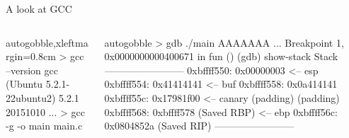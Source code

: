 \documentclass[beamer]{uibk}
\begin{document}
\begin{frame}[fragile]{A look at GCC}
    \begin{columns}
        \begin{column}{0.5\textwidth}
            \begin{pre*}{autogobble,xleftmargin=0.8cm}
                > gcc --version
                gcc (Ubuntu 5.2.1-22ubuntu2) 5.2.1 20151010
                  ...
                > gcc -g -o main main.c
            \end{pre*}
        \end{column}
        \pause
        \begin{column}{0.5\textwidth}
            \begin{pre*}{autogobble}
                > gdb ./main
                AAAAAAA
                  ...
                Breakpoint 1, 0x0000000000400671 in fun ()
                (gdb) show-stack
                Stack
                ------------------------
                0xbffff550: 0x00000003             <-- esp
                0xbffff554: 0x41414141             <-- buf
                0xbffff558: 0x0a414141
                0xbffff55c: 0x17981f00             <-- canary
                       (padding)
                       (padding)
                0xbffff568: 0xbffff578 (Saved RBP) <-- ebp
                0xbffff56c: 0x0804852a (Saved RIP)
                ------------------------
            \end{pre*}
        \end{column}
    \end{columns}
\end{frame}
\end{document}
